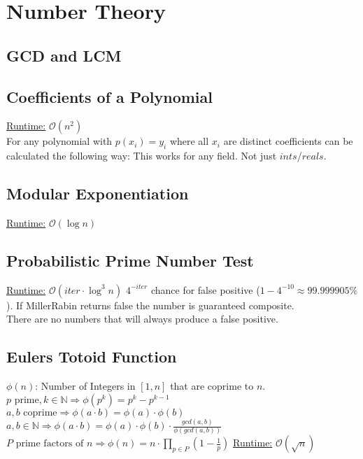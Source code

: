 \section{Number Theory}
\subsection{GCD and LCM}

\subsection{Coefficients of a Polynomial}
\underline{Runtime:} $\mathcal{O}(n^2)$ \\
For any polynomial with $p(x_i) = y_i$ where all $x_i$ are distinct
coefficients can be calculated the following way:
This works for any field. Not just $ints$/$reals$.
\subsection{Modular Exponentiation}
\underline{Runtime:} $\mathcal{O}(\log n)$

\subsection{Probabilistic Prime Number Test}
\underline{Runtime:} $\mathcal{O}(iter \cdot \log^3 n)$
$4^{-iter}$ chance for false positive ($1 - 4^{-10} \approx 99.999905\%$). If MillerRabin returns false the number is guaranteed composite. \\
There are no numbers that will always produce a false positive.

\subsection{Eulers Totoid Function}
$\phi(n)$: Number of Integers in $[1, n]$ that are coprime to $n$.\\
$p \text{ prime}, k \in \mathbb{N} \Rightarrow \phi(p^k) = p^k - p^{k-1}$ \\
$a, b \text{ coprime} \Rightarrow \phi(a \cdot b) = \phi(a) \cdot \phi(b)$ \\
$a, b \in \mathbb{N} \Rightarrow \phi(a \cdot b) = \phi(a) \cdot \phi(b) \cdot \frac{gcd(a, b)}{\phi(gcd(a,b))}$ \\
$P \text{ prime factors of } n \Rightarrow \phi(n) = n \cdot \prod_{p \in P} (1 - \frac{1}{p})$
\underline{Runtime:} $\mathcal{O}(\sqrt{n})$
